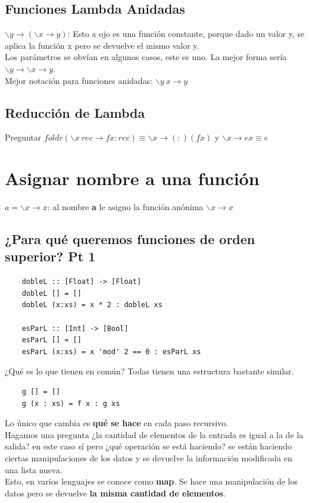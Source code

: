 \documentclass[10pt,a4paper]{article}
\begin{document}
\subsection*{Funciones Lambda Anidadas}
$\backslash y \rightarrow (\backslash x \rightarrow y)$: Esto a ojo es una función constante, porque dado un valor y, se aplica la función x pero se devuelve el mismo valor y. \\
Los parámetros se obvían en algunos casos, este es uno. La mejor forma sería $\backslash y \rightarrow \backslash x \rightarrow y$. \\
Mejor notación para funciones anidadas: $\backslash y \ x \rightarrow y$
\subsection*{Reducción de Lambda}
Preguntar $foldr(\backslash x \ rec \rightarrow fx:rec) \equiv \backslash x \rightarrow (:)(fx)$ y $ \backslash x \rightarrow ex \equiv e$
\section*{Asignar nombre a una función}
$a = \backslash x \rightarrow x $: al nombre \textbf{a} le asigno la función anónima $\backslash x \rightarrow x$
\subsection*{¿Para qué queremos funciones de orden superior? Pt 1}
\begin{lstlisting}
    dobleL :: [Float] -> [Float]
    dobleL [] = []
    dobleL (x:xs) = x * 2 : dobleL xs 

    esParL :: [Int] -> [Bool]
    esParL [] = []
    esParL (x:xs) = x 'mod' 2 == 0 : esParL xs
\end{lstlisting}

¿Qué es lo que tienen en común? Todas tienen una estructura bastante similar.
\begin{lstlisting}
    g [] = []
    g (x : xs) = f x : g xs
\end{lstlisting}
Lo único que cambia es \textbf{qué se hace} en cada paso recursivo. \\
Hagamos una pregunta ¿la cantidad de elementos de la entrada es igual a la de la salida? en este caso sí pero ¿qué operación se está haciendo? se están haciendo ciertas manipulaciones de los datos y se devuelve la información modificada en una lista nueva. \\
Esto, en varios lenguajes se conoce como \textbf{map}. Se hace una manipulación de los datos pero se devuelve \textbf{la misma cantidad de elementos}. 
\end{document}
